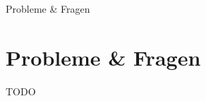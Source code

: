 

\begin{frame}{Probleme \& Fragen}
    \section{Probleme \& Fragen}\label{sec:probleme-&-fragen}

    TODO


\end{frame}